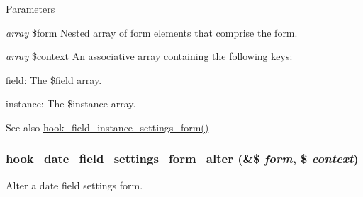 \begin{DoxyParams}{Parameters}
\item[{\em array}]\$form Nested array of form elements that comprise the form. \item[{\em array}]\$context An associative array containing the following keys:
\begin{DoxyItemize}
\item field: The \$field array.
\item instance: The \$instance array.
\end{DoxyItemize}\end{DoxyParams}
\begin{DoxySeeAlso}{See also}
\hyperlink{group__field__types_gacce0ff92e36c0054ad131d95e576a13a}{hook\_\-field\_\-instance\_\-settings\_\-form()} 
\end{DoxySeeAlso}
\hypertarget{date_8api_8php_a109a61aa1f6183f9431a4b8e1b929e0b}{
\subsubsection[{hook\_\-date\_\-field\_\-settings\_\-form\_\-alter}]{\setlength{\rightskip}{0pt plus 5cm}hook\_\-date\_\-field\_\-settings\_\-form\_\-alter (\&\$ {\em form}, \/  \$ {\em context})}}
\label{date_8api_8php_a109a61aa1f6183f9431a4b8e1b929e0b}
Alter a date field settings form.


